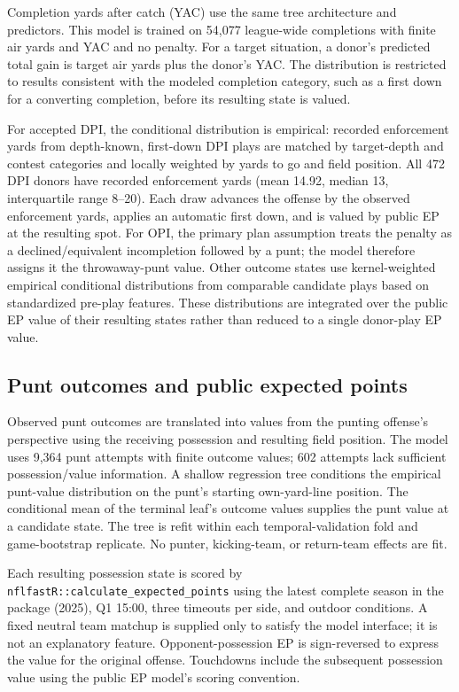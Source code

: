 \documentclass[11pt]{article}
\begin{document}
Completion yards after catch (YAC) use the same tree architecture and predictors. This model is trained on 54,077 league-wide completions with finite air yards and YAC and no penalty. For a target situation, a donor's predicted total gain is target air yards plus the donor's YAC. The distribution is restricted to results consistent with the modeled completion category, such as a first down for a converting completion, before its resulting state is valued.

For accepted DPI, the conditional distribution is empirical: recorded enforcement yards from depth-known, first-down DPI plays are matched by target-depth and contest categories and locally weighted by yards to go and field position. All 472 DPI donors have recorded enforcement yards (mean 14.92, median 13, interquartile range 8--20). Each draw advances the offense by the observed enforcement yards, applies an automatic first down, and is valued by public EP at the resulting spot. For OPI, the primary plan assumption treats the penalty as a declined/equivalent incompletion followed by a punt; the model therefore assigns it the throwaway-punt value. Other outcome states use kernel-weighted empirical conditional distributions from comparable candidate plays based on standardized pre-play features. These distributions are integrated over the public EP value of their resulting states rather than reduced to a single donor-play EP value.

\subsection{Punt outcomes and public expected points}

Observed punt outcomes are translated into values from the punting offense's perspective using the receiving possession and resulting field position. The model uses 9,364 punt attempts with finite outcome values; 602 attempts lack sufficient possession/value information. A shallow regression tree conditions the empirical punt-value distribution on the punt's starting own-yard-line position. The conditional mean of the terminal leaf's outcome values supplies the punt value at a candidate state. The tree is refit within each temporal-validation fold and game-bootstrap replicate. No punter, kicking-team, or return-team effects are fit.

Each resulting possession state is scored by \texttt{nflfastR::calculate\_expected\_points} using the latest complete season in the package (2025), Q1 15:00, three timeouts per side, and outdoor conditions. A fixed neutral team matchup is supplied only to satisfy the model interface; it is not an explanatory feature. Opponent-possession EP is sign-reversed to express the value for the original offense. Touchdowns include the subsequent possession value using the public EP model's scoring convention.
\end{document}
